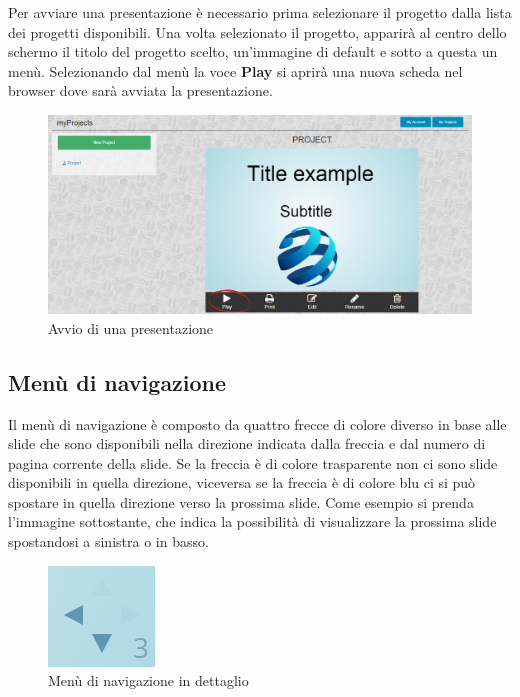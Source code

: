 Per avviare una presentazione è necessario prima selezionare il progetto dalla lista dei progetti disponibili. Una volta selezionato il progetto, apparirà al centro dello schermo il titolo del progetto scelto, un'immagine di default e sotto a questa un menù. Selezionando dal menù la voce \textbf{Play} si aprirà una nuova scheda nel browser dove sarà avviata la presentazione.

\begin{figure}[H] 
	\centering 
	\includegraphics[scale=0.40] {img/avv_pres.png}
	\caption{Avvio di una presentazione} 
\end{figure}

\subsection{Menù di navigazione}
\noindent Il menù di navigazione è composto da quattro frecce di colore diverso in base alle slide che sono disponibili nella direzione indicata dalla freccia e dal numero di pagina corrente della slide. Se la freccia è di colore trasparente non ci sono slide disponibili in quella direzione, viceversa se la freccia è di colore blu ci si può spostare in quella direzione verso la prossima slide. Come esempio si prenda l'immagine sottostante, che indica la possibilità di visualizzare la prossima slide spostandosi a sinistra o in basso.

\begin{figure}[H] 
	\centering 
	\includegraphics[scale=0.70] {img/nav.png}
	\caption{Menù di navigazione in dettaglio} 
	\end{figure}

